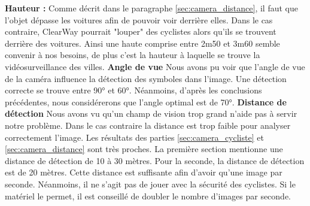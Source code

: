 \textbf{Hauteur :}
\newline
Comme décrit dans le paragraphe \ref{sec:camera_distance}, il faut que l'objet dépasse les voitures afin de pouvoir voir derrière elles.
Dans le cas contraire, ClearWay pourrait "louper" des cyclistes alors qu'ils se trouvent derrière des voitures.
Ainsi une haute comprise entre 2m50 et 3m60 semble convenir à nos besoins, de plus c'est la hauteur à laquelle se trouve la vidéosurveillance des villes.
\newline \newline
\textbf{Angle de vue}
\newline
Nous avons pu voir que l'angle de vue de la caméra influence la détection des symboles dans l'image. Une détection correcte se trouve entre 90° et 60°.
Néanmoins, d'après les conclusions précédentes, nous considérerons que l'angle optimal est de 70°.\newline\newline
\textbf{Distance de détection}
\newline
Nous avons vu qu'un champ de vision trop grand n'aide pas à servir notre problème. Dans le cas contraire la distance est trop faible pour analyser correctement l'image.
Les résultats des parties \ref{sec:camera_cycliste} et \ref{sec:camera_distance} sont très proches.
La première section mentionne une distance de détection de 10 à 30 mètres. Pour la seconde, la distance de détection est de 20 mètres.
Cette distance est suffisante afin d'avoir qu'une image par seconde. Néanmoins, il ne s'agit pas de jouer avec la sécurité des cyclistes.
Si le matériel le permet, il est conseillé de doubler le nombre d'images par seconde.
